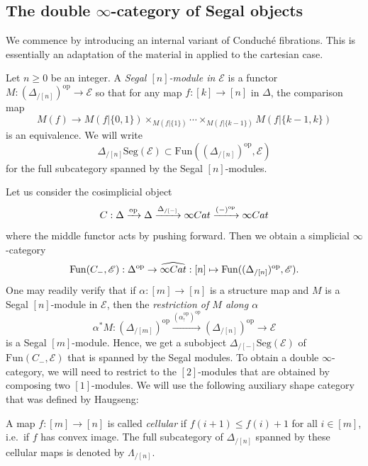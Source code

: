 \documentclass[a4paper, 11pt]{amsart}
\numberwithin{theorem}{section}
\theoremstyle{definition}
\newcommand{\cat}[1]{\textup{#1}}
\newcommand{\op}{\mathrm{op}}
\newcommand{\fun}{\mathrm{Fun}}
\newcommand{\Cat}{\cat{Cat}}
\newcommand{\E}{\mathscr{E}}
\newcommand{\Seg}{\mathrm{Seg}}
\begin{document}
\subsection{The double $\infty$-category of Segal objects}\label{ssection.conduche-modules}

We commence by introducing an internal variant of Conduch\'e fibrations. This is essentially an adaptation of the material in \cite{HaugsengMorita} 
applied to the cartesian case. 

\begin{definition}\label{def.cat-modules}
	Let $n \geq 0$ be an integer.
	 A \textit{Segal $[n]$-module in $\E$} 
	is a functor 
	$
	M : (\Delta_{/[n]})^\op \rightarrow \E 
	$
	so that for any map $f : [k] \rightarrow [n]$ in $\Delta$, the comparison map
	$$
	M(f) \rightarrow M(f|\{0,1\}) \times_{M(f|\{1\})} \dotsb \times_{M(f|\{k-1\})} M(f|\{k-1,k\})
	$$
	is an equivalence. We will write 
	$$
	{\Delta_{/[n]}}\Seg(\E) \subset \fun((\Delta_{/[n]})^\op, \E)
	$$
	for the full subcategory spanned by the Segal $[n]$-modules.
\end{definition}

Let us consider the cosimplicial object
$$
C : \Delta \xrightarrow{\op} \Delta \xrightarrow{\Delta_{/[-]}} \infty\Cat \xrightarrow{(-)^\op} \infty\Cat
$$
where the middle functor acts by pushing forward.
Then we obtain a simplicial $\infty$-category $$\fun(C_-, \E) : \Delta^\op \rightarrow \widehat{\infty\Cat} : [n] \mapsto \fun((\Delta_{/[n]})^\op, \E).$$
One may readily verify that 
 if $\alpha : [m] \rightarrow [n]$ is a structure map and $M$ is a Segal $[n]$-module in $\E$,
then the \textit{restriction of $M$ along $\alpha$} 
$$
\alpha^*M : (\Delta_{/[m]})^\op \xrightarrow{(\alpha^\op_!)^\op} (\Delta_{/[n]})^\op \rightarrow \E
$$
is a Segal $[m]$-module. Hence, we get a subobject $\Delta_{/[-]}\Seg(\E)$ of $\fun(C_-, \E)$ 
that is spanned by the Segal modules. To obtain a double $\infty$-category, we will need to 
restrict to the 
$[2]$-modules that are obtained by composing two $[1]$-modules. We will use the following auxiliary shape category that was defined by Haugseng:

\begin{definition}
	A map $f : [m] \rightarrow [n]$ is called \textit{cellular} if $f(i+1) \leq f(i) +1$ for all $i \in [m]$, i.e.\ if $f$ has convex image. The 
	full subcategory of $\Delta_{/[n]}$ spanned by these cellular maps is denoted by $\Lambda_{/[n]}$.
\end{definition}
\end{document}
